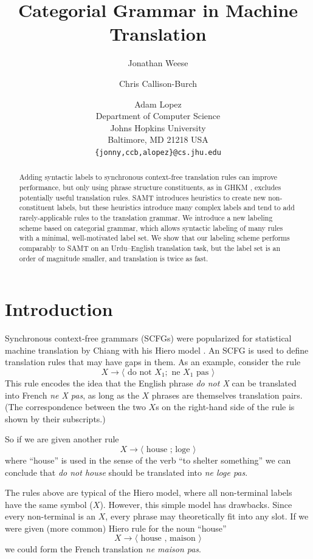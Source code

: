 \documentclass[a4paper]{article}
\author{Jonathan Weese \and Chris Callison-Burch \and Adam Lopez\\Department of Computer Science\\Johns Hopkins University\\Baltimore, MD 21218 USA\\{\tt \{jonny,ccb,alopez\}@cs.jhu.edu}}
\title{Categorial Grammar in Machine Translation}
\begin{document}
\maketitle

\begin{abstract}
Adding syntactic labels to synchronous context-free translation rules can improve performance, but only using phrase structure constituents, as in GHKM \cite{ghkm}, excludes potentially useful translation rules. SAMT \cite{samt-wmt06} introduces heuristics to create new non-constituent labels, but these heuristics introduce many complex labels and tend to add rarely-applicable rules to the translation grammar. We introduce a new labeling scheme based on categorial grammar, which allows syntactic labeling of many rules with a minimal, well-motivated label set. We show that our labeling scheme performs comparably to SAMT on an Urdu--English translation task, but the label set is an order of magnitude smaller, and translation is twice as fast.
\end{abstract}

\section{Introduction}

Synchronous context-free grammars (SCFGs) were popularized for statistical machine translation by Chiang with his Hiero model . An SCFG is used to define translation rules that may have gaps in them.
As an example, consider the rule
\begin{equation}
X \to \langle \textrm{ do not } X_1 ; \textrm{ ne } X_1 \textrm{ pas } \rangle \label{rule:ne_pas}
\end{equation}
This rule encodes the idea that the English phrase {\em do not X} can be translated into French {\em ne X pas}, as long as the $X$ phrases are themselves translation pairs. (The correspondence between the two $X$s on the right-hand side of the rule is shown by their subscripts.)

So if we are given another rule
\begin{equation}
X \to \langle \textrm{ house ; loge } \rangle
\end{equation}
where ``house'' is used in the sense of the verb ``to shelter something'' we can conclude that {\em do not house} should be translated into {\em ne loge pas}.

The rules above are typical of the Hiero model, where all non-terminal labels have the same symbol ($X$). However, this simple model has drawbacks. Since every non-terminal is an $X$, every phrase may theoretically fit into any slot. If we were given (more common) Hiero rule for the noun ``house''
\begin{equation}
X \to \langle \textrm{ house , maison } \rangle
\end{equation}
we could form the French translation {\em ne maison pas}. 
\end{document}
